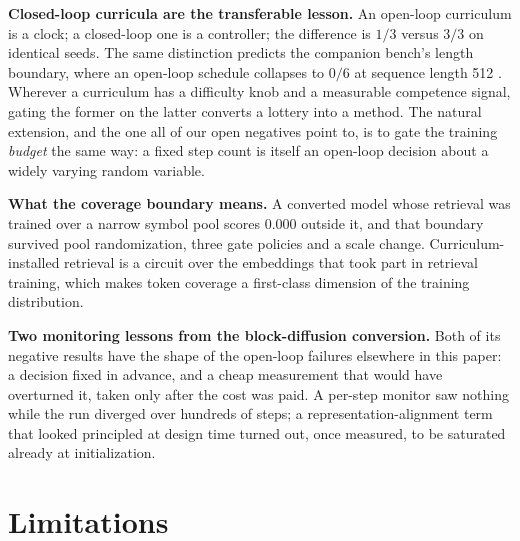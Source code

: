 \documentclass{article}
\begin{document}
\textbf{Closed-loop curricula are the transferable lesson.} An open-loop curriculum is a clock; a closed-loop one is a controller; the difference is $1/3$ versus $3/3$ on identical seeds. The same distinction predicts the companion bench's length boundary, where an open-loop schedule collapses to $0/6$ at sequence length 512 \citep{anatomyrecall}. Wherever a curriculum has a difficulty knob and a measurable competence signal, gating the former on the latter converts a lottery into a method. The natural extension, and the one all of our open negatives point to, is to gate the training \emph{budget} the same way: a fixed step count is itself an open-loop decision about a widely varying random variable.

\textbf{What the coverage boundary means.} A converted model whose retrieval was trained over a narrow symbol pool scores $0.000$ outside it, and that boundary survived pool randomization, three gate policies and a scale change. Curriculum-installed retrieval is a circuit over the embeddings that took part in retrieval training, which makes token coverage a first-class dimension of the training distribution.

\textbf{Two monitoring lessons from the block-diffusion conversion.} Both of its negative results have the shape of the open-loop failures elsewhere in this paper: a decision fixed in advance, and a cheap measurement that would have overturned it, taken only after the cost was paid. A per-step monitor saw nothing while the run diverged over hundreds of steps; a representation-alignment term that looked principled at design time turned out, once measured, to be saturated already at initialization.

\section{Limitations}\label{sec:limits}
\end{document}
